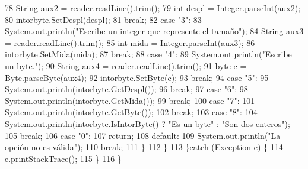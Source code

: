 \begin{DoxyCode}
78                     String aux2 = reader.readLine().trim();
79                     \textcolor{keywordtype}{int} despl = Integer.parseInt(aux2);
80                     intorbyte.SetDespl(despl);
81                 \textcolor{keywordflow}{break};
82                 \textcolor{keywordflow}{case} \textcolor{stringliteral}{"3"}:
83                     System.out.println(\textcolor{stringliteral}{"Escribe un integer que represente el tamaño"});
84                     String aux3 = reader.readLine().trim();
85                     \textcolor{keywordtype}{int} mida = Integer.parseInt(aux3);
86                     intorbyte.SetMida(mida);
87                 \textcolor{keywordflow}{break};
88                 \textcolor{keywordflow}{case} \textcolor{stringliteral}{"4"}:
89                     System.out.println(\textcolor{stringliteral}{"Escribe un byte."});
90                     String aux4 = reader.readLine().trim();
91                     byte c = Byte.parseByte(aux4);
92                     intorbyte.SetByte(c);
93                 \textcolor{keywordflow}{break};
94                 \textcolor{keywordflow}{case} \textcolor{stringliteral}{"5"}:
95                     System.out.println(intorbyte.GetDespl());
96                 \textcolor{keywordflow}{break};
97                 \textcolor{keywordflow}{case} \textcolor{stringliteral}{"6"}:
98                     System.out.println(intorbyte.GetMida());
99                 \textcolor{keywordflow}{break};
100                 \textcolor{keywordflow}{case} \textcolor{stringliteral}{"7"}:
101                     System.out.println(intorbyte.GetByte());
102                 \textcolor{keywordflow}{break};
103                 \textcolor{keywordflow}{case} \textcolor{stringliteral}{"8"}:
104                     System.out.println(intorbyte.IsIntorByte() ? \textcolor{stringliteral}{"Es un byte"} : \textcolor{stringliteral}{"Son dos enteros"});
105                 \textcolor{keywordflow}{break};
106                 \textcolor{keywordflow}{case} \textcolor{stringliteral}{"0"}:
107                     \textcolor{keywordflow}{return};
108                 \textcolor{keywordflow}{default}:
109                     System.out.println(\textcolor{stringliteral}{"La opción no es válida"});
110                 \textcolor{keywordflow}{break};
111             \}
112         \}
113     \}\textcolor{keywordflow}{catch} (Exception e) \{
114         e.printStackTrace();
115     \}
116     \}
\end{DoxyCode}
\mbox{\label{classdomini_1_1utils_1_1Driver____IntorByte_a4b647dae1760fc058de9a7311595d8dd}} 
